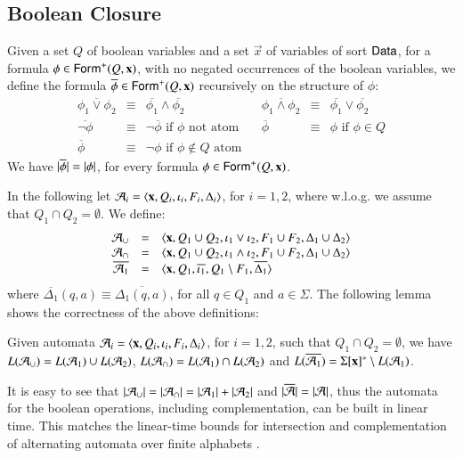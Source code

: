 \documentclass[10pt,conference,letterpaper,twocolumn]{IEEEtran}
\begin{document}
\subsection{Boolean Closure}

Given a set $Q$ of boolean variables and a set $\vec{x}$ of variables
of sort $\mathsf{Data}$, for a formula $\phi \in \mathsf{Form}^+(Q,\mathbf x)$, with no
negated occurrences of the boolean variables, we define the formula
$\overline{\phi} \in \mathsf{Form}^+(Q,\mathbf x)$ recursively on the structure
of $\phi$:
\[\begin{array}{rclcrcl}
\overline{\phi_1 \vee \phi_2} & \equiv & \overline{\phi_1} \wedge \overline{\phi_2} && 
\overline{\phi_1 \wedge \phi_2} & \equiv & \overline{\phi_1} \vee \overline{\phi_2} \\ 
\overline{\neg\phi} & \equiv & \neg \overline{\phi} \text{ if $\phi$ not atom} &&
\overline{\phi} & \equiv & \phi \text{ if $\phi \in Q$} \\
\overline{\phi} & \equiv & \neg\phi \text{ if $\phi \not\in Q$ atom}
\end{array}\]
We have ${|{\overline{\phi}}|} = {|{\phi}|}$, for every formula $\phi
\in \mathsf{Form}^+(Q,\mathbf x)$.

In the following let $\mathcal{A}_i =
\left\langle \mathbf x,Q_i,\iota_i,F_i,\Delta_i \right\rangle$, for $i=1,2$, where
w.l.o.g. we assume that $Q_1 \cap Q_2 = \emptyset$. We define:
\[\begin{array}{rcl}
\mathcal{A}_\cup & = & \left\langle \mathbf x,Q_1\cup Q_2,\iota_1 \vee \iota_2,F_1\cup F_2,\Delta_1\cup\Delta_2 \right\rangle \\ 
\mathcal{A}_\cap & = & \left\langle \mathbf x,Q_1\cup Q_2,\iota_1 \wedge \iota_2, F_1\cup F_2, \Delta_1\cup\Delta_2 \right\rangle \\ 
\overline{\mathcal{A}_1} & = & \langle \mathbf x,Q_1,\overline{\iota_1},Q_1\setminus F_1,\overline{\Delta_1} \rangle
\end{array}\] 
where $\overline{\Delta_1}(q,a) \equiv \overline{\Delta_1(q,a)}$, for
all $q \in Q_1$ and $a \in \Sigma$. The following lemma shows the
correctness of the above definitions:

\begin{lemma}\label{lemma:closure}
  Given automata $\mathcal{A}_i = \left\langle \mathbf x,Q_i,\iota_i,F_i,\Delta_i \right\rangle$,
  for $i=1,2$, such that $Q_1 \cap Q_2 = \emptyset$, we have
  $L(\mathcal{A}_\cup) = L(\mathcal{A}_1) \cup L(\mathcal{A}_2)$, $L(\mathcal{A}_\cap) = L(\mathcal{A}_1) \cap
  L(\mathcal{A}_2)$ and $L(\overline{\mathcal{A}_1}) = \Sigma[\mathbf x]^* \setminus
  L(\mathcal{A}_1)$.
\end{lemma}

It is easy to see that ${|{\mathcal{A}_\cup}|} = {|{\mathcal{A}_\cap}|} = {|{\mathcal{A}_1}|} +
{|{\mathcal{A}_2}|}$ and ${|{\overline{\mathcal{A}}}|} = {|{\mathcal{A}}|}$, thus the automata
for the boolean operations, including complementation, can be built in
linear time. This matches the linear-time bounds for intersection and
complementation of alternating automata over finite alphabets
\cite{ChandraKozenStockmeyer81}.
\end{document}
